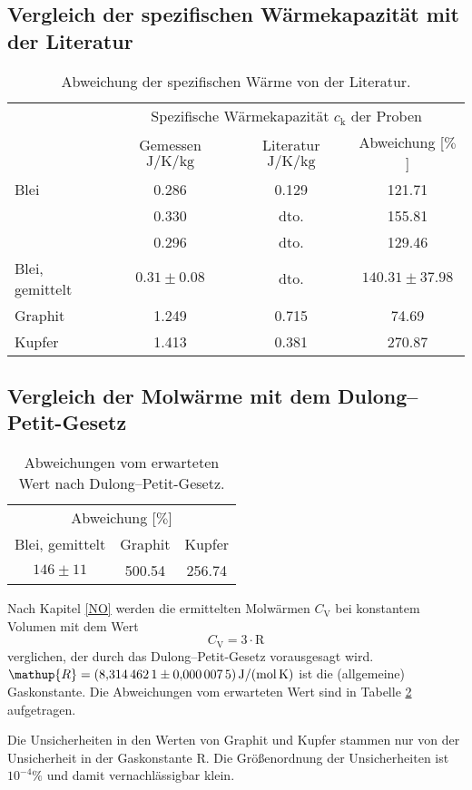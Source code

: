 \subsection{Vergleich der spezifischen Wärmekapazität mit der Literatur}
\begin{table}[htbp]
	\centering
	\begin{tabular}{lccc}
		\toprule
		&\multicolumn{3}{c}{Spezifische Wärmekapazität $c_\text{k}$ der Proben}\\
		&{Gemessen $\si{\joule\per\kelvin\per\kilo\gram}$}  &{Literatur $\si{\joule\per\kelvin\per\kilo\gram}$}& {Abweichung [$\%$]}\\
		\midrule
		{Blei}	&0.286	&0.129	&121.71\\
				&0.330	&dto.	&155.81\\
				&0.296	&dto.	&129.46\\
		{Blei, gemittelt}	&$0.31\pm0.08$	&dto.	&$140.31\pm 37.98$\\
		{Graphit}&1.249 &0.715& 74.69\\
		{Kupfer}&1.413	&0.381	& 270.87\\
		\bottomrule
	\end{tabular}
	\caption{Abweichung der spezifischen Wärme von der Literatur\cite{SpeziWaerme}.}
	\label{tab:compare}
\end{table}
\subsection{Vergleich der Molwärme mit dem Dulong--Petit-Gesetz}
\begin{table}[htbp]
	\centering
	\begin{tabular}{ccc}
		\toprule
		\multicolumn{3}{c}{Abweichung [$\%$]}\\
		{Blei, gemittelt}	&{Graphit}&{Kupfer}\\
		\midrule
		$146\pm11$	&500.54	&256.74\\
		\bottomrule
	\end{tabular}
	\caption{Abweichungen vom erwarteten Wert nach Dulong--Petit-Gesetz.}
	\label{tab:failz}
\end{table}
Nach Kapitel \ref{NO} werden die ermittelten Molwärmen $C_\mathup{V}$ bei konstantem Volumen mit dem Wert
\begin{equation}
	C_\mathup{V} = 3\cdot \mathup{R}
\end{equation}
verglichen, der durch das Dulong--Petit-Gesetz vorausgesagt wird.\\
$\mathup{R}= \SI{8.3144621\pm0.0000075}{\joule\per\mol\per\kelvin}$ ist die (allgemeine) Gaskonstante\cite{Gaskonstante}.
Die Abweichungen vom erwarteten Wert sind in Tabelle \ref{tab:failz} aufgetragen. 

Die Unsicherheiten in den Werten von Graphit und Kupfer stammen nur von der Unsicherheit in der Gaskonstante $\mathup{R}$. 
Die Größenordnung der Unsicherheiten ist $10^{-4}\%$ und damit vernachlässigbar klein.

